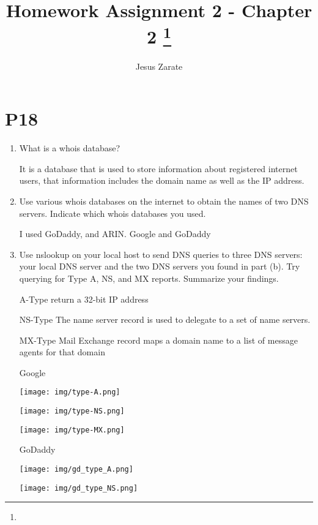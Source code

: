 \documentclass[11pt]{article}
\title{Homework Assignment 2 - Chapter 2
\footnote{\s{CS4480-Computer Networks; \;\; Spring 2017 \hfill}}}
\author{Jesus Zarate}
\begin{document}
\maketitle





\section*{P18}
\begin{enumerate}[label=(\alph*)]
\item What is a whois database?

It is a database that is used to store information about registered internet users, that information includes the domain name as well as the IP address.

\item Use various whois databases on the internet to obtain the names of two DNS servers. Indicate which whois databases you used.

I used GoDaddy, and ARIN. Google and GoDaddy

\item Use nslookup on your local host to send DNS queries to three DNS servers: your local DNS server and the two DNS servers you found in part (b). Try querying for Type A, NS, and MX reports. Summarize your findings.

A-Type return a 32-bit IP address

NS-Type The name server record is used to delegate to a set of name servers.

MX-Type Mail Exchange record maps a domain name to a list of message agents for that domain


Google

\begin{center}
\texttt{[image: img/type-A.png]}


\texttt{[image: img/type-NS.png]}


\texttt{[image: img/type-MX.png]}
\end{center}

GoDaddy

\begin{center}
\texttt{[image: img/gd\_type\_A.png]}


\texttt{[image: img/gd\_type\_NS.png]}



\end{center}
\end{enumerate}
\end{document}
